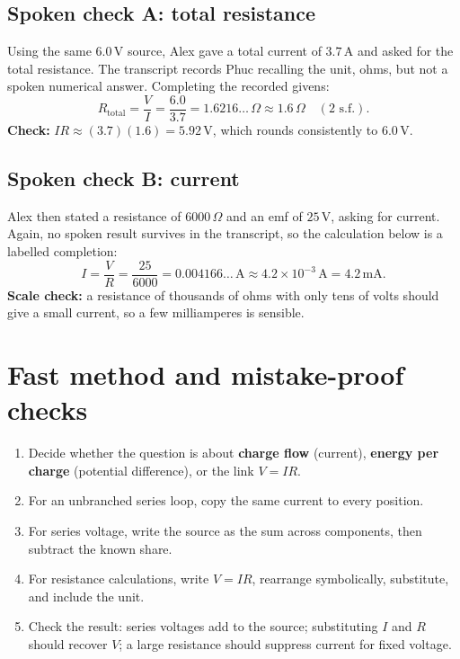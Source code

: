 \documentclass[11pt,a4paper]{article}
\begin{document}
\subsection{Spoken check A: total resistance}
Using the same $6.0\,\mathrm{V}$ source, Alex gave a total current of $3.7\,\mathrm{A}$ and asked for the total resistance. The transcript records Phuc recalling the unit, ohms, but not a spoken numerical answer. Completing the recorded givens:
\[
R_{\text{total}}=\frac{V}{I}=\frac{6.0}{3.7}=1.6216\ldots\,\Omega\approx\boxed{1.6\,\Omega}\quad(2\text{ s.f.}).
\]
\textbf{Check:} $IR\approx(3.7)(1.6)=5.92\,\mathrm{V}$, which rounds consistently to $6.0\,\mathrm{V}$.

\subsection{Spoken check B: current}
Alex then stated a resistance of $6000\,\Omega$ and an emf of $25\,\mathrm{V}$, asking for current. Again, no spoken result survives in the transcript, so the calculation below is a labelled completion:
\[
I=\frac{V}{R}=\frac{25}{6000}=0.004166\ldots\,\mathrm{A}\approx\boxed{4.2\times10^{-3}\,\mathrm{A}}=\boxed{4.2\,\mathrm{mA}}.
\]
\textbf{Scale check:} a resistance of thousands of ohms with only tens of volts should give a small current, so a few milliamperes is sensible.

\section{Fast method and mistake-proof checks}
\begin{enumerate}
\item Decide whether the question is about \textbf{charge flow} (current), \textbf{energy per charge} (potential difference), or the link $V=IR$.
\item For an unbranched series loop, copy the same current to every position.
\item For series voltage, write the source as the sum across components, then subtract the known share.
\item For resistance calculations, write $V=IR$, rearrange symbolically, substitute, and include the unit.
\item Check the result: series voltages add to the source; substituting $I$ and $R$ should recover $V$; a large resistance should suppress current for fixed voltage.
\end{enumerate}
\end{document}
